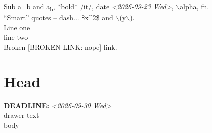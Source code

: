 Sub a\_b and a\textsubscript{b}, *bold* /it/, date \textit{<2026-09-23 Wed>}, $\backslash$alpha, fn.\\
``Smart'' quotes -- dash... \$x\^{}2\$ and $\backslash$(y$\backslash$).\\
Line one\\
line two\\
Broken {[}BROKEN LINK: nope] link.\\
\section{ Head}
\label{sec:orga06cbf5}
\noindent\textbf{DEADLINE:} \textit{<2026-09-30 Wed>}\\
drawer text\\
body\\
